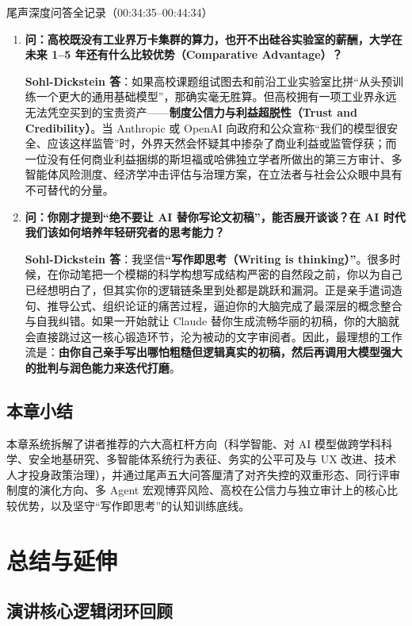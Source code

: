 \documentclass[a4paper]{article}
\begin{document}
\begin{importantbox}{尾声深度问答全记录（00:34:35--00:44:34）}
\begin{enumerate}
    \item \textbf{问：高校既没有工业界万卡集群的算力，也开不出硅谷实验室的薪酬，大学在未来 1--5 年还有什么比较优势（Comparative Advantage）？}
    
    \textbf{Sohl-Dickstein 答}：如果高校课题组试图去和前沿工业实验室比拼“从头预训练一个更大的通用基础模型”，那确实毫无胜算。但高校拥有一项工业界永远无法凭空买到的宝贵资产——\textbf{制度公信力与利益超脱性（Trust and Credibility）}。当 Anthropic 或 OpenAI 向政府和公众宣称“我们的模型很安全、应该这样监管”时，外界天然会怀疑其中掺杂了商业利益或监管俘获；而一位没有任何商业利益捆绑的斯坦福或哈佛独立学者所做出的第三方审计、多智能体风险测度、经济学冲击评估与治理方案，在立法者与社会公众眼中具有不可替代的分量。

    \item \textbf{问：你刚才提到“绝不要让 AI 替你写论文初稿”，能否展开谈谈？在 AI 时代我们该如何培养年轻研究者的思考能力？}
    
    \textbf{Sohl-Dickstein 答}：我坚信\textbf{“写作即思考（Writing is thinking）”}。很多时候，在你动笔把一个模糊的科学构想写成结构严密的自然段之前，你以为自己已经想明白了，但其实你的逻辑链条里到处都是跳跃和漏洞。正是亲手遣词造句、推导公式、组织论证的痛苦过程，逼迫你的大脑完成了最深层的概念整合与自我纠错。如果一开始就让 Claude 替你生成流畅华丽的初稿，你的大脑就会直接跳过这一核心锻造环节，沦为被动的文字审阅者。因此，最理想的工作流是：\textbf{由你自己亲手写出哪怕粗糙但逻辑真实的初稿，然后再调用大模型强大的批判与润色能力来迭代打磨}。
\end{enumerate}
\end{importantbox}

\subsection{本章小结}
本章系统拆解了讲者推荐的六大高杠杆方向（科学智能、对 AI 模型做跨学科科学、安全地基研究、多智能体系统行为表征、务实的公平可及与 UX 改进、技术人才投身政策治理），并通过尾声五大问答厘清了对齐失控的双重形态、同行评审制度的演化方向、多 Agent 宏观博弈风险、高校在公信力与独立审计上的核心比较优势，以及坚守“写作即思考”的认知训练底线。

\clearpage
\section{总结与延伸}

\subsection{演讲核心逻辑闭环回顾}
\end{document}

